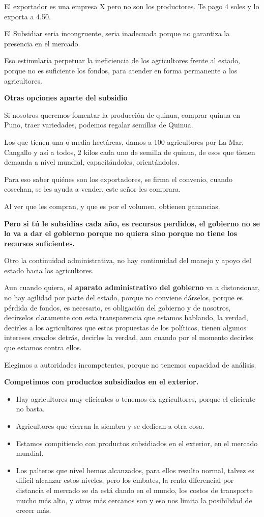 \documentclass[
  a4paper,
]{article}
\begin{document}
El exportador es una empresa X pero no son los productores. Te pago 4
soles y lo exporta a 4.50.

El Subsidiar seria incongruente, seria inadecuada porque no garantiza la
presencia en el mercado.

Eso estimularía perpetuar la ineficiencia de los agricultores frente al
estado, porque no es suficiente los fondos, para atender en forma
permanente a los agricultores.

\textbf{Otras opciones aparte del subsidio}

Si nosotros queremos fomentar la producción de quinua, comprar quinua en
Puno, traer variedades, podemos regalar semillas de Quinua.

Los que tienen una o media hectáreas, damos a 100 agricultores por La
Mar, Cangallo y así a todos, 2 kilos cada uno de semilla de quinua, de
esos que tienen demanda a nivel mundial, capacitándoles, orientándoles.

Para eso saber quiénes son los exportadores, se firma el convenio,
cuando cosechan, se les ayuda a vender, este señor les comprara.

Al ver que les compran, y que es por el volumen, obtienen ganancias.

\textbf{Pero si tú le subsidias cada año, es recursos perdidos, el
gobierno no se lo va a dar el gobierno porque no quiera sino porque no
tiene los recursos suficientes.}

Otro la continuidad administrativa, no hay continuidad del manejo y
apoyo del estado hacia los agricultores.

Aun cuando quiera, el \textbf{aparato administrativo del gobierno} va a
distorsionar, no hay agilidad por parte del estado, porque no conviene
dárselos, porque es pérdida de fondos, es necesario, es obligación del
gobierno y de nosotros, decírselos claramente con esta transparencia que
estamos hablando, la verdad, decirles a los agricultores que estas
propuestas de los políticos, tienen algunos intereses creados detrás,
decirles la verdad, aun cuando por el momento decirles que estamos
contra ellos.

Elegimos a autoridades incompetentes, porque no tenemos capacidad de
análisis.

\textbf{Competimos con productos subsidiados en el exterior.}

\begin{itemize}
\item
  Hay agricultores muy eficientes o tenemos ex agricultores, porque el
  eficiente no basta.
\item
  Agricultores que cierran la siembra y se dedican a otra cosa.
\item
  Estamos compitiendo con productos subsidiados en el exterior, en el
  mercado mundial.
\item
  Los palteros que nivel hemos alcanzados, para ellos resulto normal,
  talvez es difícil alcanzar estos niveles, pero los embates, la renta
  diferencial por distancia el mercado se da está dando en el mundo, los
  costos de transporte mucho más alto, y otros más cercanos son y eso
  nos limita la posibilidad de crecer más.
\end{itemize}
\end{document}

